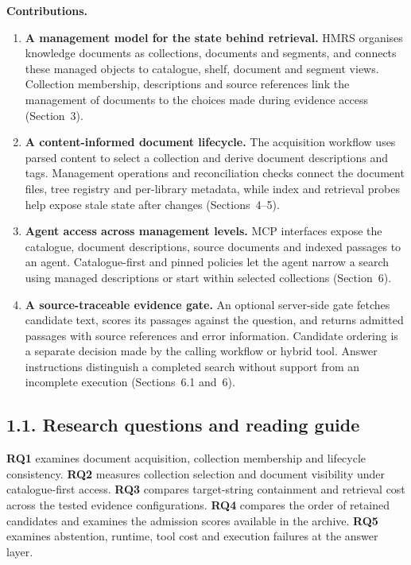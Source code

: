 \noindent\textbf{Contributions.}
\begin{enumerate}
\item \textbf{A management model for the state behind retrieval.} HMRS
organises knowledge documents as collections, documents and segments, and
connects these managed objects to catalogue, shelf, document and segment
views. Collection membership, descriptions and source references link the
management of documents to the choices made during evidence access
(Section~3).
\item \textbf{A content-informed document lifecycle.} The acquisition
workflow uses parsed content to select a collection and derive document
descriptions and tags. Management operations and reconciliation checks
connect the document files, tree registry and per-library metadata, while
index and retrieval probes help expose stale state after changes
(Sections~4--5).
\item \textbf{Agent access across management levels.} MCP interfaces expose
the catalogue, document descriptions, source documents and indexed passages
to an agent. Catalogue-first and pinned policies let the agent narrow a
search using managed descriptions or start within selected collections
(Section~6).
\item \textbf{A source-traceable evidence gate.} An optional server-side
gate fetches candidate text, scores its passages against the question, and
returns admitted passages with source references and error information.
Candidate ordering is a separate decision made by the calling workflow or
hybrid tool. Answer instructions distinguish a completed search without
support from an incomplete execution
(Sections~6.1 and~6).
\end{enumerate}

\subsection{1.1. Research questions and reading guide}


\textbf{RQ1} examines document acquisition, collection membership and
lifecycle consistency. \textbf{RQ2} measures collection selection and
document visibility under catalogue-first access. \textbf{RQ3} compares
target-string containment and retrieval cost across the tested evidence
configurations. \textbf{RQ4} compares the order of retained candidates and
examines the admission scores available in the archive.
\textbf{RQ5} examines abstention, runtime, tool cost and execution failures
at the answer layer.

